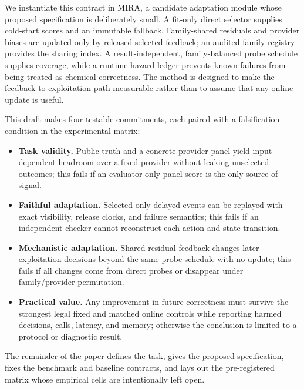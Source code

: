 \documentclass[sigconf,anonymous]{aamas}
\newcommand{\mira}{MIRA\xspace}
\begin{document}
We instantiate this contract in \mira, a candidate adaptation module whose proposed specification is deliberately small. A fit-only direct selector supplies cold-start scores and an immutable fallback. Family-shared residuals and provider biases are updated only by released selected feedback; an audited family registry provides the sharing index. A result-independent, family-balanced probe schedule supplies coverage, while a runtime hazard ledger prevents known failures from being treated as chemical correctness. The method is designed to make the feedback-to-exploitation path measurable rather than to assume that any online update is useful.

This draft makes four testable commitments, each paired with a falsification condition in the experimental matrix:
\begin{itemize}[leftmargin=*,itemsep=1pt,topsep=2pt]
    \item \textbf{Task validity.} Public truth and a concrete provider panel yield input-dependent headroom over a fixed provider without leaking unselected outcomes; this fails if an evaluator-only panel score is the only source of signal.
    \item \textbf{Faithful adaptation.} Selected-only delayed events can be replayed with exact visibility, release clocks, and failure semantics; this fails if an independent checker cannot reconstruct each action and state transition.
    \item \textbf{Mechanistic adaptation.} Shared residual feedback changes later exploitation decisions beyond the same probe schedule with no update; this fails if all changes come from direct probes or disappear under family/provider permutation.
    \item \textbf{Practical value.} Any improvement in future correctness must survive the strongest legal fixed and matched online controls while reporting harmed decisions, calls, latency, and memory; otherwise the conclusion is limited to a protocol or diagnostic result.
\end{itemize}
The remainder of the paper defines the task, gives the proposed specification, fixes the benchmark and baseline contracts, and lays out the pre-registered matrix whose empirical cells are intentionally left open.
\end{document}
